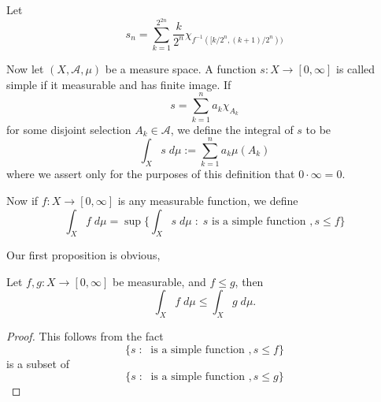 \documentclass{owmaths}
\begin{document}
Let 
\begin{equation*}
    s_n = \sum_{k=1}^{2^{2n}} \frac{k}{2^n}\chi_{f^{-1}([k/2^n,(k+1)/2^n))}
\end{equation*}

Now let $(X,\mathcal{A},\mu)$ be a measure space. A function $s:X\rightarrow[0,\infty]$
is called simple if it measurable and has finite image. If
\begin{equation*}
    s = \sum_{k=1}^n a_k \chi_{A_k}
\end{equation*}
for some disjoint selection $A_k \in \mathcal{A}$, we define the integral of $s$
to be
\begin{equation*}
    \int_X s\;d\mu := \sum_{k=1}^n a_k\mu(A_k)
\end{equation*}
where we assert only for the purposes of this definition that $0\cdot\infty = 0$.

Now if $f:X\rightarrow [0,\infty]$ is any measurable function, we define
\begin{equation*}
    \int_X f\;d\mu = \sup\{\int_X s\;d\mu\;:\;s\text{ is a simple function },s \leq f\}
\end{equation*}

Our first proposition is obvious,
\begin{proposition}
    Let $f,g:X\rightarrow[0,\infty]$ be measurable, and $f \leq g$, then
    \begin{equation*}
        \int_X f\;d\mu \leq \int_X g\;d\mu.
    \end{equation*}
\end{proposition}
\begin{proof}
    This follows from the fact 
    \begin{equation*}
        \{s\;:\;\text{ is a simple function },s \leq f\}
    \end{equation*}
    is a subset of
    \begin{equation*}
        \{s\;:\;\text{ is a simple function },s \leq g\}
    \end{equation*}
\end{proof}
\end{document}
